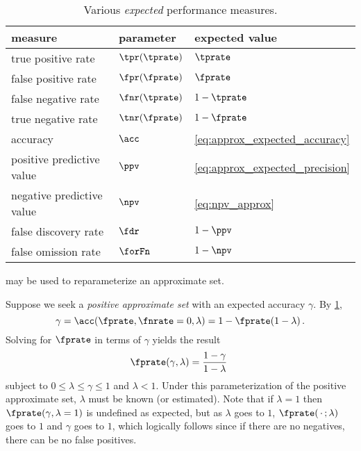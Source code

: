 \documentclass[ ../main.tex]{subfiles}
\begin{document}
\begin{table}
	\centering
	\caption{Various \emph{expected} performance measures.}
	\label{tbl:perf_sum}    
	\begin{tabular}{@{} l l l @{}}
		\toprule
		\textbf{measure} & \textbf{parameter} & \textbf{expected value}\\
		\midrule
		true positive rate & $\tpr(\tprate)$ & $\tprate$\\
		false positive rate & $\fpr(\fprate)$ & $\fprate$\\
		false negative rate & $\fnr(\tprate)$ & $1-\tprate$\\
		true negative rate & $\tnr(\fprate)$ & $1-\fprate$\\
		accuracy & $\acc$ & \cref{eq:approx_expected_accuracy}\\        
		positive predictive value & $\ppv$ & \cref{eq:approx_expected_precision}\\
		negative predictive value & $\npv$ & \cref{eq:npv_approx}\\        
		false discovery rate & $\fdr$ & $1-\ppv$\\
		false omission rate & $\forFn$ & $1-\npv$\\
		\bottomrule
	\end{tabular}
\end{table}
 may be used to reparameterize an approximate set.
\begin{example}
	Suppose we seek a \emph{positive approximate set} with an expected accuracy 
	$\gamma$. By \cref{tbl:perf_sum},
	\begin{equation}
	\gamma = \acc(\fprate,\fnrate=0,\lambda) = 1 - \fprate(1 - \lambda)\,.
	\end{equation}
	Solving for $\fprate$ in terms of $\gamma$ yields the result
	\begin{equation}
	\fprate(\gamma, \lambda) = \frac{1 - \gamma}{1 - 
		\lambda}\
	\end{equation}
	subject to $0 \leq \lambda \leq \gamma \leq 1$ and $\lambda < 1$.
	Under this parameterization of the 	positive approximate set, $\lambda$ 
	must be known (or estimated).
	Note that if $\lambda = 1$ then $\fprate(\gamma, \lambda=1)$ is undefined as expected, but as $\lambda$ goes to $1$, $\fprate(\,\cdot\,; \lambda)$ goes to $1$ and $\gamma$ goes to $1$, which logically follows since if there are no negatives, there can be no false positives.
\end{example}
\end{document}
